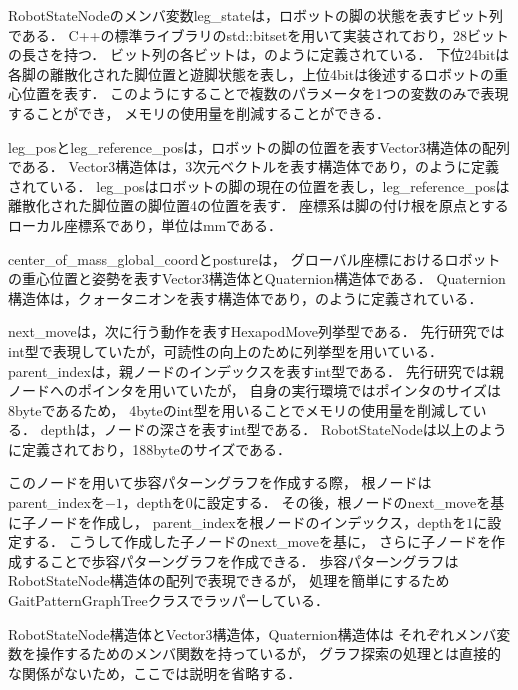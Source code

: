 RobotStateNodeのメンバ変数leg\_stateは，ロボットの脚の状態を表すビット列である．
C++の標準ライブラリのstd::bitsetを用いて実装されており，28ビットの長さを持つ．
ビット列の各ビットは，のように定義されている．
下位24bitは各脚の離散化された脚位置と遊脚状態を表し，上位4bitは後述するロボットの重心位置を表す．
このようにすることで複数のパラメータを1つの変数のみで表現することができ，
メモリの使用量を削減することができる．

leg\_posとleg\_reference\_posは，ロボットの脚の位置を表すVector3構造体の配列である．
Vector3構造体は，3次元ベクトルを表す構造体であり，のように定義されている．
leg\_posはロボットの脚の現在の位置を表し，leg\_reference\_posは離散化された脚位置の脚位置4の位置を表す．
座標系は脚の付け根を原点とするローカル座標系であり，単位はmmである．

center\_of\_mass\_global\_coordとpostureは，
グローバル座標におけるロボットの重心位置と姿勢を表すVector3構造体とQuaternion構造体である．
Quaternion構造体は，クォータニオンを表す構造体であり，のように定義されている．

next\_moveは，次に行う動作を表すHexapodMove列挙型である．
先行研究ではint型で表現していたが，可読性の向上のために列挙型を用いている．
parent\_indexは，親ノードのインデックスを表すint型である．
先行研究では親ノードへのポインタを用いていたが，
自身の実行環境ではポインタのサイズは8byteであるため，
4byteのint型を用いることでメモリの使用量を削減している．
depthは，ノードの深さを表すint型である．
RobotStateNodeは以上のように定義されており，188byteのサイズである．

このノードを用いて歩容パターングラフを作成する際，
根ノードはparent\_indexを$-1$，depthを$0$に設定する．
その後，根ノードのnext\_moveを基に子ノードを作成し，
parent\_indexを根ノードのインデックス，depthを$1$に設定する．
こうして作成した子ノードのnext\_moveを基に，
さらに子ノードを作成することで歩容パターングラフを作成できる．
歩容パターングラフはRobotStateNode構造体の配列で表現できるが，
処理を簡単にするためGaitPatternGraphTreeクラスでラッパーしている．

RobotStateNode構造体とVector3構造体，Quaternion構造体は
それぞれメンバ変数を操作するためのメンバ関数を持っているが，
グラフ探索の処理とは直接的な関係がないため，ここでは説明を省略する．
\\ 

